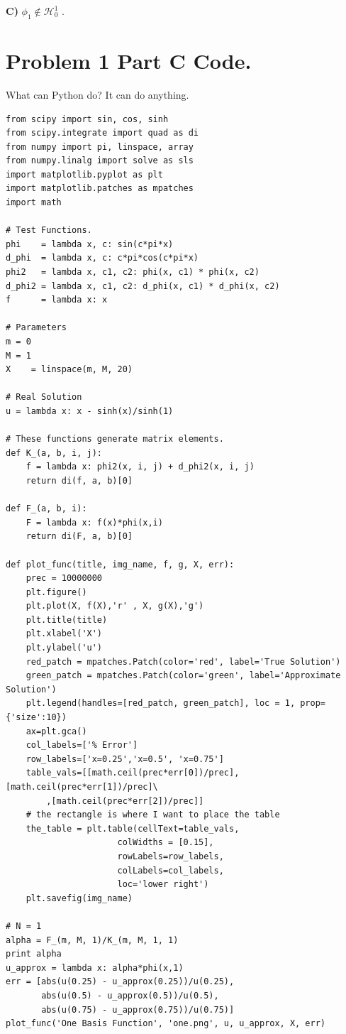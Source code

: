 \documentclass[10pt]{article}
\newcommand{\tbf}[1]{\textbf{#1}}
\begin{document}
\tbf{C)} $\phi_1 \notin \mathcal{H}_0^1$ .
\section*{Problem 1 Part C Code.} What can Python do? It can do anything.

\begin{lstlisting}
from scipy import sin, cos, sinh
from scipy.integrate import quad as di
from numpy import pi, linspace, array
from numpy.linalg import solve as sls
import matplotlib.pyplot as plt
import matplotlib.patches as mpatches
import math

# Test Functions.
phi    = lambda x, c: sin(c*pi*x)
d_phi  = lambda x, c: c*pi*cos(c*pi*x)
phi2   = lambda x, c1, c2: phi(x, c1) * phi(x, c2)
d_phi2 = lambda x, c1, c2: d_phi(x, c1) * d_phi(x, c2)
f      = lambda x: x

# Parameters 
m = 0
M = 1
X    = linspace(m, M, 20)

# Real Solution
u = lambda x: x - sinh(x)/sinh(1)

# These functions generate matrix elements.
def K_(a, b, i, j):
    f = lambda x: phi2(x, i, j) + d_phi2(x, i, j)
    return di(f, a, b)[0]    

def F_(a, b, i):
    F = lambda x: f(x)*phi(x,i)
    return di(F, a, b)[0]

def plot_func(title, img_name, f, g, X, err):
    prec = 10000000
    plt.figure()
    plt.plot(X, f(X),'r' , X, g(X),'g')
    plt.title(title)
    plt.xlabel('X')
    plt.ylabel('u')
    red_patch = mpatches.Patch(color='red', label='True Solution')
    green_patch = mpatches.Patch(color='green', label='Approximate Solution')
    plt.legend(handles=[red_patch, green_patch], loc = 1, prop={'size':10})
    ax=plt.gca()
    col_labels=['% Error']
    row_labels=['x=0.25','x=0.5', 'x=0.75']
    table_vals=[[math.ceil(prec*err[0])/prec],[math.ceil(prec*err[1])/prec]\
        ,[math.ceil(prec*err[2])/prec]]
    # the rectangle is where I want to place the table
    the_table = plt.table(cellText=table_vals,
                      colWidths = [0.15],
                      rowLabels=row_labels,
                      colLabels=col_labels,
                      loc='lower right')
    plt.savefig(img_name)
    
# N = 1
alpha = F_(m, M, 1)/K_(m, M, 1, 1)
print alpha
u_approx = lambda x: alpha*phi(x,1)
err = [abs(u(0.25) - u_approx(0.25))/u(0.25), 
       abs(u(0.5) - u_approx(0.5))/u(0.5), 
       abs(u(0.75) - u_approx(0.75))/u(0.75)]
plot_func('One Basis Function', 'one.png', u, u_approx, X, err)


\end{lstlisting}
\end{document}
